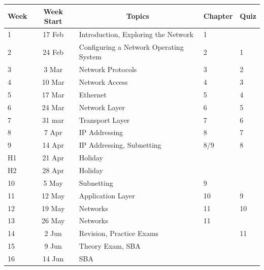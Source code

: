 \documentclass{article}
\begin{document}
\renewcommand{\arraystretch}{1.5}
\begin{tabular}{|l|c|l|l|l|}
\hline
 Week & Week Start & \multicolumn{1}{c|}{Topics}                   & Chapter & Quiz \\ \hline
 1    & 17 Feb     & Introduction, Exploring the Network           &  1      &   \\ \hline
 2    & 24 Feb     & Configuring a Network Operating System        &  2      &  1 \\ \hline
 3    &  3 Mar     & Network Protocols                             &  3      &  2 \\ \hline
 4    & 10 Mar     & Network Access                                &  4      &  3  \\ \hline
 5    & 17 Mar     & Ethernet                                      &  5      &  4 \\ \hline
 6    & 24 Mar     & Network Layer                                 &  6      &  5 \\ \hline
 7    & 31 mar     & Transport Layer                               &  7      &  6 \\ \hline
 8    &  7 Apr     & IP Addressing                                 &  8      &  7 \\ \hline
 9    & 14 Apr     & IP Addressing, Subnetting                     &  8/9    &  8 \\ \hline
 H1   & 21 Apr     & Holiday                                       &         &    \\ \hline
 H2   & 28 Apr     & Holiday                                       &         &    \\ \hline
 10   &  5 May     & Subnetting                                    &  9      &    \\ \hline
 11   & 12 May     & Application Layer                             &  10     &  9 \\ \hline
 12   & 19 May     & Networks                                      &  11     &  10 \\ \hline
 13   & 26 May     & Networks                                      &  11     &    \\ \hline
 14   &  2 Jun     & Revision, Practice Exams                      &         &  11 \\ \hline
 15   &  9 Jun     & Theory Exam, SBA                              &         &  \\ \hline
 16   & 14 Jun     & SBA                                           &         &  \\ \hline
\end{tabular}
\end{document}
